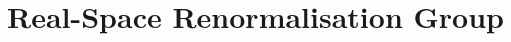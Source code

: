 \documentclass[../main.tex]{subfiles}
\begin{document}
\chapter{Real-Space Renormalisation Group}




\end{document}
